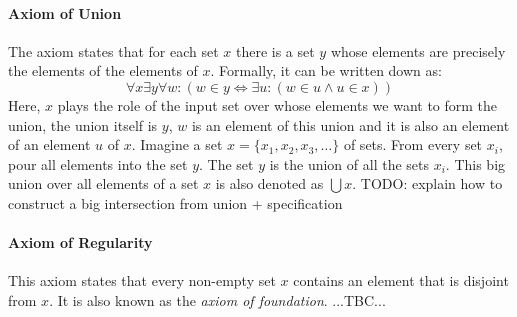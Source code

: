 

\paragraph{Axiom of Union}
The axiom states that for each set $x$ there is a set $y$ whose elements are precisely the elements of the elements of $x$. Formally, it can be written down as:
\begin{equation}
\forall x \exists y \forall w:
(w \in y \Leftrightarrow \exists u:(w \in u \wedge u \in x )  )
\end{equation}
Here, $x$ plays the role of the input set over whose elements we want to form the union, the union itself is $y$, $w$ is an element of this union and it is also an element of an element $u$ of $x$. Imagine a set $x = \{ x_1, x_2, x_3, \ldots \} $ of sets. From every set $x_i$, pour all elements into the set $y$. The set $y$ is the union of all the sets $x_i$. This big union over all elements of a set $x$ is also denoted as $\bigcup x$. TODO: explain how to construct a big intersection from union + specification


\paragraph{Axiom of Regularity}
This axiom states that every non-empty set $x$ contains an element that is disjoint from $x$. It is also known as the \emph{axiom of foundation}. ...TBC...





